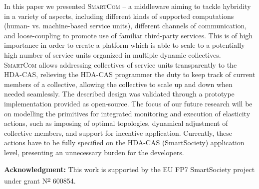 \documentclass{llncs}
\newcommand{\mdl}{\textsc{SmartCom}}
\begin{document}
  In this paper we presented \mdl{} -- a middleware aiming to tackle hybridity in a variety of aspects, including different kinds of supported computations (human- vs. machine-based service units), different channels of communication, and loose-coupling to promote use of familiar third-party services. This is of high importance in order to create a platform which is able to scale to a potentially high number of service units organized in multiple dynamic collectives. \mdl{} allows addressing collectives of service units transparently to the HDA-CAS, relieving the HDA-CAS programmer the duty to keep track of current members of a collective, allowing the collective to scale up and down when needed seamlessly. The described design was validated through a prototype implementation provided as open-source.
  The focus of our future research will be on modelling the primitives for integrated monitoring and execution of elasticity actions, such as imposing of optimal topologies, dynamical adjustment of collective members, and support for incentive application. Currently, these actions have to be fully specified on the HDA-CAS (SmartSociety) application level, presenting an unnecessary burden for the developers.

\textbf{Acknowledgment: }
This work is supported by the EU FP7 SmartSociety project under grant N\textsuperscript{\underline{o}} 600854.

\vspace{-4pt}


\end{document}
